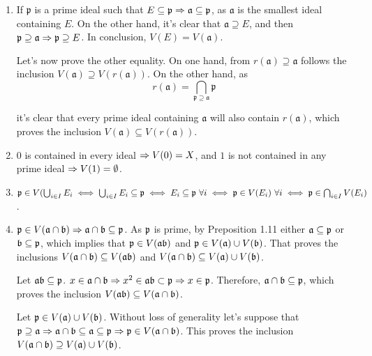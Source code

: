 \begin{sol}
	\begin{enumerate}[label=(\roman*)]
		\item If $\mathfrak{p}$ is a prime ideal such that $E \subseteq \mathfrak{p} \Rightarrow \mathfrak{a} \subseteq \mathfrak{p}$, as $\mathfrak{a}$ is the smallest ideal containing $E$. On the other hand, it's clear that $\mathfrak{a} \supseteq E$, and then $\mathfrak{p} \supseteq \mathfrak{a} \Rightarrow \mathfrak{p} \supseteq E$. In conclusion, $V(E) = V(\mathfrak{a})$.

		Let's now prove the other equality. On one hand, from $r(\mathfrak{a}) \supseteq \mathfrak{a}$ follows the inclusion $V(\mathfrak{a}) \supseteq V(r(\mathfrak{a}))$. On the other hand, as 
		\[
			r(\mathfrak{a}) = \bigcap_{\mathfrak{p} \supseteq \mathfrak{a}} \mathfrak{p}
		\]

		it's clear that every prime ideal containing $\mathfrak{a}$ will also contain $r(\mathfrak{a})$, which proves the inclusion $V(\mathfrak{a}) \subseteq V(r(\mathfrak{a}))$.

		\item $0$ is contained in every ideal $\Rightarrow V(0) = X$, and $1$ is not contained in any prime ideal $\Rightarrow V(1) = \emptyset$.

		\item $\mathfrak{p} \in V(\bigcup_{i \in I} E_i \iff \bigcup_{i \in I} E_i \subseteq \mathfrak{p} \iff E_i \subseteq \mathfrak{p} \, \, \forall i \iff \mathfrak{p} \in V(E_i) \, \, \forall i \iff \mathfrak{p} \in \bigcap_{i \in I} V(E_i)$.

		\item $\mathfrak{p} \in V(\mathfrak{a} \cap \mathfrak{b}) \Rightarrow \mathfrak{a} \cap \mathfrak{b} \subseteq \mathfrak{p}$. As $\mathfrak{p}$ is prime, by Preposition 1.11 either $\mathfrak{a} \subseteq \mathfrak{p}$ or $\mathfrak{b} \subseteq \mathfrak{p}$, which implies that $\mathfrak{p} \in V(\mathfrak{a} \mathfrak{b})$ and $\mathfrak{p} \in V(\mathfrak{a}) \cup V(\mathfrak{b})$. That proves the inclusions $V(\mathfrak{a} \cap \mathfrak{b}) \subseteq V(\mathfrak{a} \mathfrak{b})$ and $V(\mathfrak{a} \cap \mathfrak{b}) \subseteq V(\mathfrak{a}) \cup V(\mathfrak{b})$.

		Let $\mathfrak{a} \mathfrak{b} \subseteq \mathfrak{p}$. $x \in \mathfrak{a} \cap \mathfrak{b} \Rightarrow x^2 \in \mathfrak{a} \mathfrak{b} \subset \mathfrak{p} \Rightarrow x \in \mathfrak{p}$. Therefore, $\mathfrak{a} \cap \mathfrak{b} \subseteq \mathfrak{p}$, which proves the inclusion $V(\mathfrak{a} \mathfrak{b}) \subseteq V(\mathfrak{a} \cap \mathfrak{b})$.

		Let $\mathfrak{p} \in V(\mathfrak{a}) \cup V(\mathfrak{b})$. Without loss of generality let's suppose that $\mathfrak{p} \supseteq \mathfrak{a} \Rightarrow \mathfrak{a} \cap \mathfrak{b} \subseteq  \mathfrak{a} \subseteq \mathfrak{p} \Rightarrow \mathfrak{p} \in V(\mathfrak{a} \cap \mathfrak{b})$. This proves the inclusion $V(\mathfrak{a} \cap \mathfrak{b}) \supseteq V(\mathfrak{a}) \cup V(\mathfrak{b})$.

	\end{enumerate}
\end{sol}

